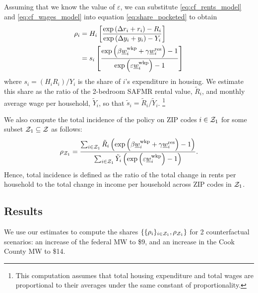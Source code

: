 Assuming that we know the value of $\varepsilon$, we can substitute
\eqref{eq:cf_rents_model} and \eqref{eq:cf_wages_model} into equation
\eqref{eq:share_pocketed} to obtain
\begin{equation}\label{eq:rho}
    \begin{split}
        \rho_i & = H_i \left[ 
        \frac{\exp \left(\Delta r_i + r_i \right) - R_i }
             {\exp \left(\Delta y_i + y_i \right) - Y_i }
        \right] \\
        & = s_i \left[
            \frac{\exp \left( \beta \underline{w}_i^{\text{wkp}} + \gamma \underline{w}_i^{\text{res}} \right) - 1 }
                {\exp \left( \varepsilon \underline{w}_i^{\text{wkp}} \right) - 1 }
            \right]
    \end{split}
\end{equation}
where $s_i = \left(H_i R_i\right)/Y_i$ is the share of $i$'s expenditure in 
housing.
We estimate this share as the ratio of the 2-bedroom SAFMR rental value, 
$\tilde R_i$, and monthly average wage per household, $\tilde Y_i$,
so that $\tilde s_i = \tilde R_i/\tilde Y_i$.%
\footnote{This computation assumes that total housing expenditure and total
wages are proportional to their averages under the same constant of 
proportionality.}

We also compute the total incidence of the policy on ZIP codes $i\in\mathcal{Z}_1$
for some subset $\mathcal{Z}_1\subseteq\mathcal{Z}$ as follows:
\begin{equation}\label{eq:tot_incidence}
    \rho_{\mathcal{Z}_1} = 
        \frac{\sum_{i\in\mathcal{Z}_1} \tilde R_i \left(\exp \left( \beta \underline{w}_i^{\text{wkp}} 
                                    + \gamma \underline{w}_i^{\text{res}} \right) - 1\right) }
            {\sum_{i\in\mathcal{Z}_1} \tilde Y_i \left( \exp \left( \varepsilon \underline{w}_i^{\text{wkp}} \right) 
                                    - 1\right) } .
\end{equation}
Hence, total incidence is defined as the ratio of the total change in rents
per household to the total change in income per household across ZIP codes 
in $\mathcal{Z}_1$.

\subsection{Results}\label{sec:results_cf}

We use our estimates to compute the shares 
$\{\{\rho_i\}_{i\in\mathcal{Z}_1},\rho_{\mathcal{Z}_1}\}$ for 2 counterfactual scenarios:
an increase of the federal MW to \$9, and 
an increase in the Cook County MW to \$14.

